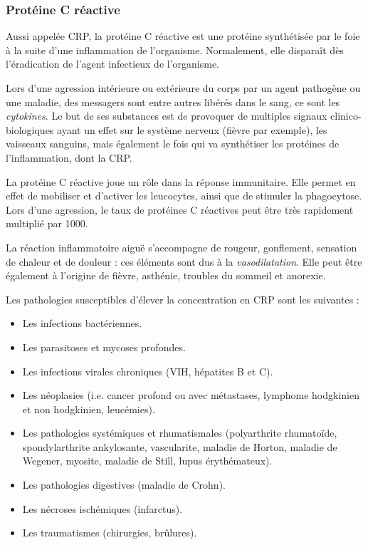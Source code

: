 \documentclass[12pt]{article}
\begin{document}
		\subsubsection{Protéine C réactive}
	Aussi appelée CRP, la protéine C réactive est une protéine synthétisée par le foie à la suite d'une inflammation de l'organisme. Normalement, elle disparaît dès l'éradication de l'agent infectieux de l'organisme.
	
	Lors d'une agression intérieure ou extérieure du corps par un agent pathogène ou une maladie, des messagers sont entre autres libérés dans le sang, ce sont les \textit{cytokines}. Le but de ses substances est de provoquer de multiples signaux clinico-biologiques ayant un effet sur le système nerveux (fièvre par exemple), les vaisseaux sanguins, mais également le fois qui va synthétiser les protéines de l'inflammation, dont la CRP.
	
	La protéine C réactive joue un rôle dans la réponse immunitaire. Elle permet en effet de mobiliser et d'activer les leucocytes, ainsi que de stimuler la phagocytose. Lors d'une agression, le taux de protéines C réactives peut être très rapidement multiplié par 1000.
	
	La réaction inflammatoire aiguë s'accompagne de rougeur, gonflement, sensation de chaleur et de douleur : ces éléments sont dus à la \textit{vasodilatation}. Elle peut être également à l'origine de fièvre, asthénie, troubles du sommeil et anorexie.
	
	Les pathologies susceptibles d'élever la concentration en CRP sont les suivantes :
	\begin{itemize}
	\item Les infections bactériennes.
	\item Les parasitoses et mycoses profondes.
	\item Les infections virales chroniques (VIH, hépatites B et C).
	\item Les néoplasies (i.e. cancer profond ou avec métastases, lymphome hodgkinien et non hodgkinien, leucémies).
	\item Les pathologies systémiques et rhumatismales (polyarthrite rhumatoïde, spondylarthrite ankylosante, vascularite, maladie de Horton, maladie de Wegener, myosite, maladie de Still, lupus érythémateux).
	\item Les pathologies digestives (maladie de Crohn).
	\item Les nécroses ischémiques (infarctus).
	\item Les traumatismes (chirurgies, brûlures).
	\end{itemize}
	
\end{document}
